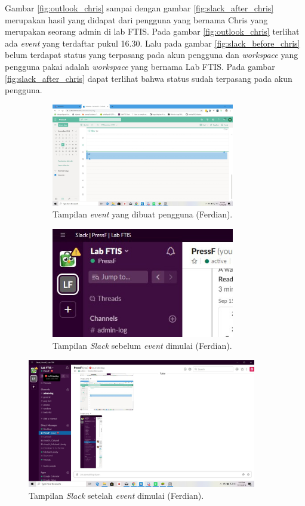 Gambar \ref{fig:outlook_chris} sampai dengan gambar \ref{fig:slack_after_chris} merupakan hasil yang didapat dari pengguna yang bernama Chris yang merupakan seorang admin di lab FTIS. Pada gambar \ref{fig:outlook_chris} terlihat ada \textit{event} yang terdaftar pukul 16.30. Lalu pada gambar \ref{fig:slack_before_chris} belum terdapat status yang terpasang pada akun pengguna dan \textit{workspace} yang pengguna pakai adalah \textit{workspace} yang bernama Lab FTIS. Pada gambar \ref{fig:slack_after_chris} dapat terlihat bahwa status sudah terpasang pada akun pengguna. 

\begin{figure}[h]
\begin{subfigure}{8.5cm}
  \centering
  \includegraphics[width=8cm]{./Gambar/PengujianFerdian/Outlook.jpg}
  \caption{Tampilan \textit{event} yang dibuat pengguna (Ferdian).}
  \label{fig:outlook_ferdian}
\end{subfigure}
\begin{subfigure}{8.5cm}
  \centering
  \includegraphics[width=8cm]{./Gambar/PengujianFerdian/Slack_Before(2).jpg}
  \caption{Tampilan \textit{Slack} sebelum \textit{event} dimulai (Ferdian).}
  \label{fig:slack_before_ferdian}
\end{subfigure}
\caption{}
\end{figure}

\begin{figure}[h]
  \includegraphics[width=10cm]{./Gambar/PengujianFerdian/Slack_After.jpg}
  \centering
  \caption{Tampilan \textit{Slack} setelah \textit{event} dimulai (Ferdian).}
  \label{fig:slack_after_ferdian}
\end{figure}

